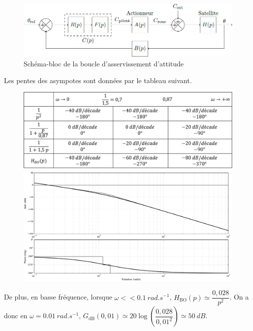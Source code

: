 \ifprof
\else

\begin{figure}[H]
\centering
\includegraphics[width=.8\linewidth]{images/fig_11}
\caption{Schéma-bloc de la boucle d’asservissement d’attitude \label{fig_11}}
\end{figure}

\fi



\ifprof
\begin{corrige}
Les pentes des asympotes sont données par le tableau suivant. 
\begin{figure}[H]
\centering
\includegraphics[width=.8\linewidth]{images/cor_q15}

\includegraphics[width=.8\linewidth]{images/cor_q15_bode}
\end{figure}

De plus, en basse fréquence, lorsque 
$\omega << \SI{0,1}{rad.s^{-1}}$, 
$H_{\text{BO}}(p)\simeq \dfrac{0,028}{p^2}$. 
On a donc  en $\omega = \SI{0,01}{rad.s^{-1}}$, $G_{\text{dB}}(0,01)\simeq 20\log \left(\dfrac{0,028}{0,01^2}\right)\simeq \SI{50}{dB}$.


\end{corrige}
\else
\fi

